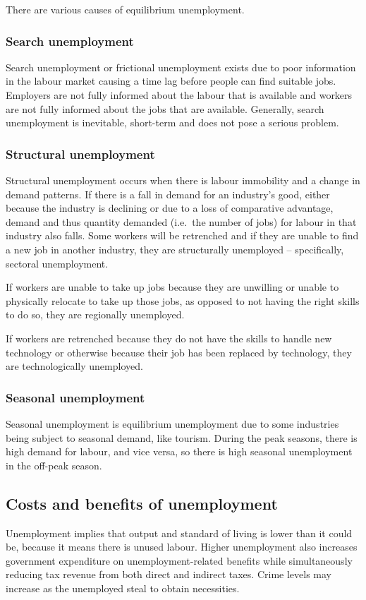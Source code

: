 \documentclass[Economics.tex]{subfiles}
\begin{document}
There are various causes of equilibrium unemployment.
\subsubsection{Search unemployment}
Search unemployment or frictional unemployment exists due to poor information in the labour market causing a time lag before people can find suitable jobs. Employers are not fully informed about the labour that is available and workers are not fully informed about the jobs that are available. Generally, search unemployment is inevitable, short-term and does not pose a serious problem.
\subsubsection{Structural unemployment}
Structural unemployment occurs when there is labour immobility and a change in demand patterns. If there is a fall in demand for an industry's good, either because the industry is declining or due to a loss of comparative advantage, demand and thus quantity demanded (i.e.\ the number of jobs) for labour in that industry also falls. Some workers will be retrenched and if they are unable to find a new job in another industry, they are structurally unemployed -- specifically, sectoral unemployment.

If workers are unable to take up jobs because they are unwilling or unable to physically relocate to take up those jobs, as opposed to not having the right skills to do so, they are regionally unemployed.

If workers are retrenched because they do not have the skills to handle new technology or otherwise because their job has been replaced by technology, they are technologically unemployed.
\subsubsection{Seasonal unemployment}
Seasonal unemployment is equilibrium unemployment due to some industries being subject to seasonal demand, like tourism. During the peak seasons, there is high demand for labour, and vice versa, so there is high seasonal unemployment in the off-peak season.
\subsection{Costs and benefits of unemployment}
Unemployment implies that output and standard of living is lower than it could be, because it means there is unused labour. Higher unemployment also increases government expenditure on unemployment-related benefits while simultaneously reducing tax revenue from both direct and indirect taxes. Crime levels may increase as the unemployed steal to obtain necessities. 
\end{document}

